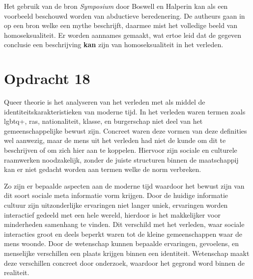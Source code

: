 \documentclass[10pt]{amsart}
\begin{document}
Het gebruik van de bron \textit{Symposium} \autocite{platoSymposium189d-193a} door Boswell en Halperin kan als een
voorbeeld beschouwd worden van abductieve beredenering. De autheurs gaan in op een bron welke een mythe beschrijft,
daarmee mist het volledige beeld van homoseksualiteit. Er worden aannames gemaakt, wat ertoe leid dat de gegeven
conclusie een beschrijving \textbf{kan} zijn van homoseksualiteit in het verleden.

\section*{Opdracht 18}

Queer theorie is het analyseren van het verleden met als middel de identiteitskarakteristieken van moderne tijd. In het
verleden waren termen zoals lgbtq+, ras, nationaliteit, klasse, en burgerschap niet deel van het gemeenschappelijke
bewust zijn. Concreet waren deze vormen van deze definities wel aanwezig, maar de mens uit het verleden had niet de
kunde om dit te beschrijven of om zich hier aan te koppelen. Hiervoor zijn sociale en culturele raamwerken
noodzakelijk, zonder de juiste structuren binnen de maatschappij kan er niet gedacht worden aan termen welke de norm
verbreken.

Zo zijn er bepaalde aspecten aan de moderne tijd waardoor het bewust zijn van dit soort sociale meta informatie vorm
krijgen. Door de huidige informatie cultuur zijn uitzonderlijke ervaringen niet langer uniek, ervaringen worden
interactief gedeeld met een hele wereld, hierdoor is het makkelijker voor minderheden samenhang te vinden. Dit
verschild met het verleden, waar sociale interacties groot en deels beperkt waren tot de kleine gemeenschappen waar de
mens woonde. Door de wetenschap kunnen bepaalde ervaringen, gevoelens, en menselijke verschillen een plaats krijgen
binnen een identiteit. Wetenschap maakt deze verschillen concreet door onderzoek, waardoor het gegrond word binnen de
realiteit.

\newpage \printbibliography{}
\end{document}
